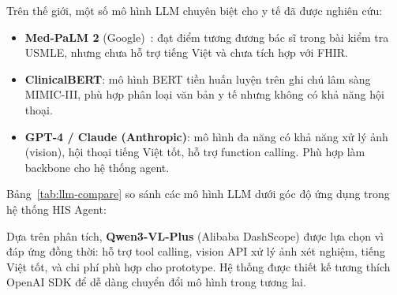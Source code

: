 \documentclass[a4paper,13pt,3p,oneside]{report}
\theoremstyle{definition}
\theoremstyle{remark}
\theoremstyle{definition}
\begin{document}
Trên thế giới, một số mô hình LLM chuyên biệt cho y tế đã được nghiên cứu:

\begin{itemize}
  \item \textbf{Med-PaLM 2} (Google)~\cite{medpalm}: đạt điểm tương đương bác sĩ trong bài kiểm tra USMLE, nhưng chưa hỗ trợ tiếng Việt và chưa tích hợp với FHIR.
  \item \textbf{ClinicalBERT}: mô hình BERT tiền huấn luyện trên ghi chú lâm sàng MIMIC-III, phù hợp phân loại văn bản y tế nhưng không có khả năng hội thoại.
  \item \textbf{GPT-4 / Claude (Anthropic)}: mô hình đa năng có khả năng xử lý ảnh (vision), hội thoại tiếng Việt tốt, hỗ trợ function calling. Phù hợp làm backbone cho hệ thống agent.
\end{itemize}

Bảng~\ref{tab:llm-compare} so sánh các mô hình LLM dưới góc độ ứng dụng trong hệ thống HIS Agent:

\begin{table}[H]
\centering
{}
\caption{So sánh các mô hình LLM theo tiêu chí ứng dụng y tế}
\label{tab:llm-compare}
\end{table}

Dựa trên phân tích, \textbf{Qwen3-VL-Plus} (Alibaba DashScope) được lựa chọn vì đáp ứng đồng thời: hỗ trợ tool calling, vision API xử lý ảnh xét nghiệm, tiếng Việt tốt, và chi phí phù hợp cho prototype. Hệ thống được thiết kế tương thích OpenAI SDK để dễ dàng chuyển đổi mô hình trong tương lai.
\end{document}
